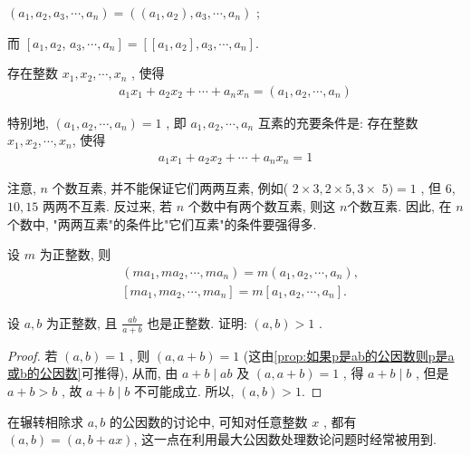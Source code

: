 \begin{property}
	$\left(a_{1}, a_{2}, a_{3}, \cdots, a_{n}\right)=\left(\left(a_{1}, a_{2}\right), a_{3}, \cdots, a_{n}\right)$ ;

	而 $\left[a_{1}, a_{2}\right.$, $\left.a_{3}, \cdots, a_{n}\right]=\left[\left[a_{1}, a_{2}\right], a_{3}, \cdots, a_{n}\right]$.
\end{property}

\begin{property}
	存在整数 $x_{1}, x_{2}, \cdots, x_{n}$ , 使得
	\begin{align*}
		a_{1} x_{1}+a_{2} x_{2}+\cdots+a_{n} x_{n}=\left(a_{1}, a_{2}, \cdots, a_{n}\right)
	\end{align*}
\end{property}

特别地,  $\left(a_{1}, a_{2}, \cdots, a_{n}\right)=1$ , 即 $a_{1}, a_{2}, \cdots, a_{n}$ 互素的充要条件是: 存在整数 $x_{1}, x_{2}, \cdots, x_{n}$, 使得
\begin{align*}
	a_{1} x_{1}+a_{2} x_{2}+\cdots+a_{n} x_{n}=1
\end{align*}

注意,  $n$ 个数互素, 并不能保证它们两两互素, 例如( $2 \times 3,2 \times 5,3 \times$ $5 )=1$ , 但 6,  $10 ,  15$ 两两不互素. 反过来, 若 $n$ 个数中有两个数互素, 则这 $n$个数互素. 因此, 在 $n$ 个数中, "两两互素"的条件比"它们互素"的条件要强得多.

\begin{property}\label{prop:最大公因数与最小公倍数的可乘性}
	设 $m$ 为正整数, 则
	\begin{align}
		 & \left(m a_{1}, m a_{2}, \cdots, m a_{n}\right)=m\left(a_{1}, a_{2}, \cdots, a_{n}\right),   \\
		 & {\left[m a_{1}, m a_{2}, \cdots, m a_{n}\right]=m\left[a_{1}, a_{2}, \cdots, a_{n}\right]}.
	\end{align}
\end{property}

\begin{example}
	设 $a ,  b$ 为正整数, 且 $\frac{a b}{a+b}$ 也是正整数. 证明:  $(a, b)>1$ .
\end{example}
\begin{proof}
	若 $(a, b)=1$ , 则 $(a, a+b)=1$ (这由\autoref{prop:如果p是ab的公因数则p是a或b的公因数}可推得), 从而, 由 $a+b \mid a b$ 及 $(a, a+b)=1$ , 得 $a+b \mid b$ , 但是 $a+b>b$ , 故 $a+b \mid b$ 不可能成立. 所以,  $(a, b)>1$.
\end{proof}
\begin{note}
	在辗转相除求 $a ,  b$ 的公因数的讨论中, 可知对任意整数 $x$ , 都有 $(a, b)=(a, b+a x)$, 这一点在利用最大公因数处理数论问题时经常被用到.
\end{note}


